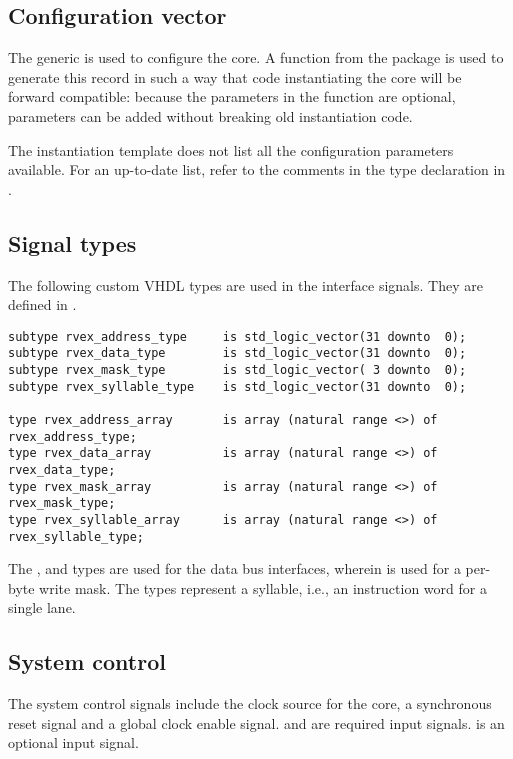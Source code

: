 \documentclass[main.tex]{subfiles}
\begin{document}
\clearpage
\subsection{Configuration vector}

The  generic is used to configure the \rvex{} core. A function from the  package is used to generate this record in such a way that code instantiating the core will be forward compatible: because the parameters in the function are optional, parameters can be added without breaking old instantiation code.

The instantiation template does not list all the configuration parameters available. For an up-to-date list, refer to the comments in the  type declaration in .

\subsection{Signal types}

The following custom VHDL types are used in the interface signals. They are defined in .

\begin{lstlisting}[numbers=none]
subtype rvex_address_type     is std_logic_vector(31 downto  0);
subtype rvex_data_type        is std_logic_vector(31 downto  0);
subtype rvex_mask_type        is std_logic_vector( 3 downto  0);
subtype rvex_syllable_type    is std_logic_vector(31 downto  0);

type rvex_address_array       is array (natural range <>) of rvex_address_type;
type rvex_data_array          is array (natural range <>) of rvex_data_type;
type rvex_mask_array          is array (natural range <>) of rvex_mask_type;
type rvex_syllable_array      is array (natural range <>) of rvex_syllable_type;
\end{lstlisting}

The ,  and  types are used for the data bus interfaces, wherein  is used for a per-byte write mask. The  types represent a syllable, i.e., an instruction word for a single lane.

\subsection{System control}

The system control signals include the clock source for the core, a synchronous reset signal and a global clock enable signal.  and  are required  input signals.  is an optional  input signal.
\end{document}
